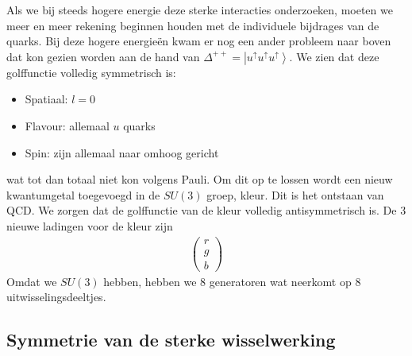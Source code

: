 \documentclass[../main.tex]{subfiles}
\begin{document}
Als we bij steeds hogere energie deze sterke interacties onderzoeken, moeten we meer en meer rekening beginnen houden met de individuele bijdrages van de quarks. Bij deze hogere energieën kwam er nog een ander probleem naar boven dat kon gezien worden aan de hand van $\Delta^{++}=\left|u^\uparrow u^\uparrow u^\uparrow\right>$. We zien dat deze golffunctie volledig symmetrisch is:
\begin{itemize}
    \item Spatiaal: $l=0$
    \item Flavour: allemaal $u$ quarks
    \item Spin: zijn allemaal naar omhoog gericht
\end{itemize}
wat tot dan totaal niet kon volgens Pauli. Om dit op te lossen wordt een nieuw kwantumgetal toegevoegd in de $SU(3)$ groep, kleur. Dit is het ontstaan van QCD. We zorgen dat de golffunctie van de kleur volledig antisymmetrisch is. De 3 nieuwe ladingen voor de kleur zijn
\begin{equation}
    \begin{aligned}
        \label{eq:kleur_lading}
        \begin{pmatrix}
            r\\
            g\\
            b
        \end{pmatrix}
    \end{aligned}
\end{equation}
Omdat we $SU(3)$ hebben, hebben we 8 generatoren wat neerkomt op 8 uitwisselingsdeeltjes.

\subsection{Symmetrie van de sterke wisselwerking}%
\label{sub:symmetrie_van_de_sterke_wisselwerking}
\end{document}
